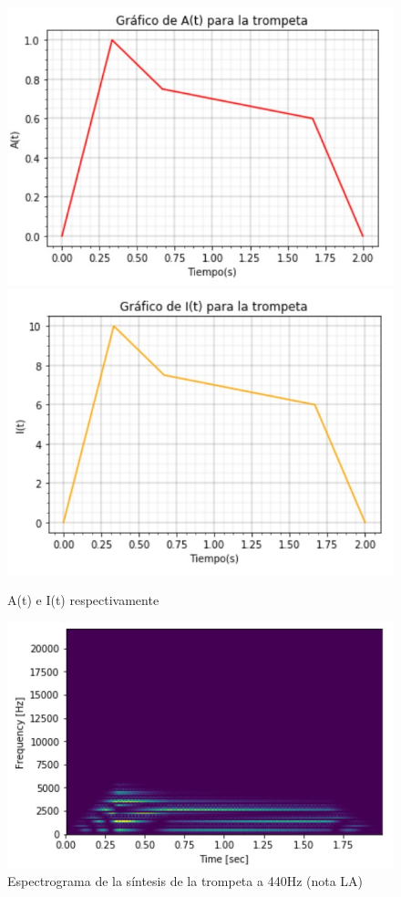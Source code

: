 \documentclass[assd_tp2_main.tex]{subfiles}
\begin{document}
\begin{figure}[H]
\centering
\includegraphics[width=0.4\linewidth]{graficos/EJ4/at_trompeta.png}
\includegraphics[width=0.4\linewidth]{graficos/EJ4/it_trompeta.png}
\caption{A(t) e I(t) respectivamente}
\label{fig:trombone_envelopes}
\end{figure}

\begin{figure}[H]
\centering
\includegraphics[width=0.4\linewidth]{graficos/EJ4/espectrograma_trompeta.png}
\caption{Espectrograma de la síntesis de la trompeta a 440Hz (nota LA)}
\label{fig:trombone_440}
\end{figure}
\end{document}
